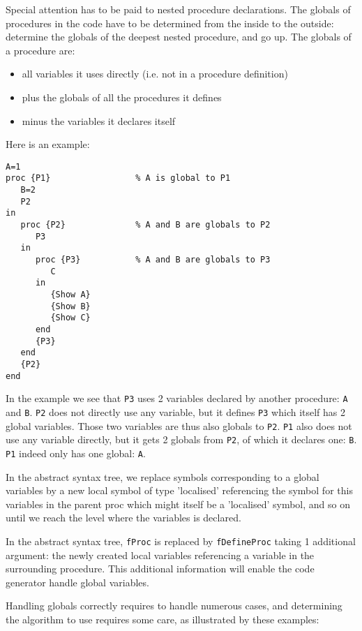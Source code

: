 \documentclass[a4paper]{memoir}
\begin{document}
Special attention has to be paid to nested procedure declarations.
The globals of procedures in the code have to be determined from the inside to the outside: determine the globals of the deepest nested procedure, and go up. 
The globals of a procedure are:
\begin{itemize}
  \item all variables it uses directly (i.e. not in a procedure definition)
  \item plus the globals of all the procedures it defines
  \item minus the variables it declares itself
\end{itemize}

Here is an example:
\begin{lstlisting}
A=1
proc {P1}                 % A is global to P1
   B=2
   P2
in
   proc {P2}              % A and B are globals to P2
      P3 
   in
      proc {P3}           % A and B are globals to P3
         C
      in
         {Show A}
         {Show B}
         {Show C}
      end
      {P3}
   end
   {P2}
end
\end{lstlisting}


In the example we see that \lstinline!P3! uses 2 variables declared by another procedure: \lstinline!A! and \lstinline!B!. 
\lstinline!P2! does not directly use any variable, but it defines \lstinline!P3! which itself has 2 global variables. Those two variables are thus also globals to \lstinline!P2!.
\lstinline!P1! also does not use any variable directly, but it gets 2 globals from \lstinline!P2!, of which it declares one: \lstinline!B!. \lstinline!P1! indeed only has one global: \lstinline!A!.

In the abstract syntax tree, we replace symbols corresponding to a global variables by a new local symbol of type 'localised' referencing the symbol for this variables in the parent proc which might itself be a 'localised' symbol, and so on until we reach the level where the variables is declared.


In the abstract syntax tree, \lstinline!fProc! is replaced by \lstinline!fDefineProc! taking 1 additional argument: the newly created local variables referencing a variable in the surrounding procedure. This additional information will enable the code generator handle global variables.

Handling globals correctly requires to handle numerous cases, and determining the algorithm to use requires some care, as illustrated by these examples:
\end{document}

